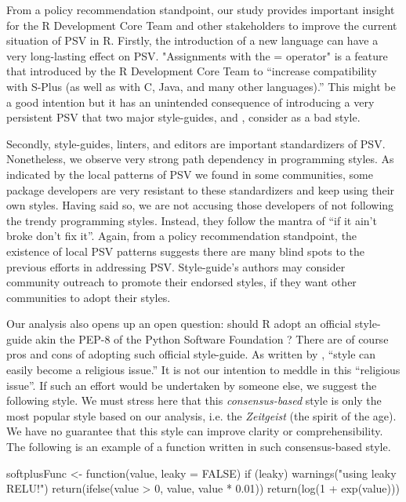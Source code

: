 From a policy recommendation standpoint, our study provides important insight for the R Development Core Team and other stakeholders to improve the current situation of PSV in R. Firstly, the introduction of a new language can have a very long-lasting effect on PSV. "Assignments with the = operator" is a feature that introduced by the R Development Core Team to ``increase compatibility with S-Plus (as well as with C, Java, and many other languages).'' \citep{chambers} This might be a good intention but it has an unintended consequence of introducing a very persistent PSV that two major style-guides, \citet{tidyverse} and \citet{google}, consider as a bad style.

Secondly, style-guides, linters, and editors are important standardizers of PSV. Nonetheless, we observe very strong path dependency in programming styles. As indicated by the local patterns of PSV we found in some communities, some package developers are very resistant to these standardizers and keep using their own styles. Having said so, we are not accusing those developers of not following the trendy programming styles. Instead, they follow the mantra of ``if it ain't broke don't fix it''. Again, from a policy recommendation standpoint, the existence of local PSV patterns suggests there are many blind spots to the previous efforts in addressing PSV. Style-guide's authors may consider community outreach to promote their endorsed styles, if they want other communities to adopt their styles.

Our analysis also opens up an open question: should R adopt an official style-guide akin the PEP-8 of the Python Software Foundation \citep{vanrossum}? There are of course pros and cons of adopting such official style-guide. As written by \citet{christiansen}, ``style can easily become a religious issue.'' It is not our intention to meddle in this ``religious issue''. If such an effort would be undertaken by someone else, we suggest the following style. We must stress here that this \emph{consensus-based} style is only the most popular style based on our analysis, i.e. the \emph{Zeitgeist} (the spirit of the age). We have no guarantee that this style can improve clarity or comprehensibility. The following is an example of a function written in such consensus-based style.

\begin{example}
softplusFunc <- function(value, leaky = FALSE) {
    if (leaky) {
        warnings("using leaky RELU!")
        return(ifelse(value > 0, value, value * 0.01))
    }
    return(log(1 + exp(value)))
}
\end{example}

